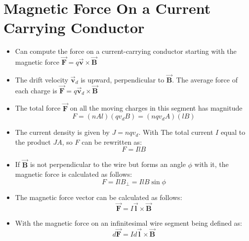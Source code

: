 \documentclass[11pt, a4paper]{article}
\begin{document}
\section[27.6, Magnetic Force On a Current Carrying Conductor]{Magnetic Force On a Current Carrying Conductor}
\begin{itemize}
    \item Can compute the force on a current-carrying conductor starting with the
        magnetic force $\vec{\mathbf{F}} = q \vec{\mathbf{v}} \times \vec{\mathbf{B}}$
    \item The drift velocity $\vec{\mathbf{v}}_d$ is upward, perpendicular to
        $\vec{\mathbf{B}}$. The average force of each charge is
        $\vec{\mathbf{F}}=q\vec{\mathbf{v}}_d \times \vec{\mathbf{B}}$ 
    \item The total force $\vec{\mathbf{F}}$ on all the moving charges in this segment
        has magnitude 
        \begin{equation}
            F = (nAl)(qv_{d}B) = (nqv_{d}A)(lB)
        \end{equation}
    \item The current density is given by $J = nqv_d$. With The total current $I$ equal
        to the product $JA$, so $F$ can be rewritten as:
        \begin{equation}
            F = IlB
        \end{equation}
    \item If $\vec{\mathbf{B}}$ is not perpendicular to the wire but forms an angle
        $\phi$ with it, the magnetic force is calculated as follows:
        \begin{equation}
            F = IlB_{\perp} = IlB\sin\phi
        \end{equation}
    \item The magnetic force vector can be calculated as follows:
        \begin{equation}
            \vec{\mathbf{F}} = I \vec{\mathbf{l}} \times \vec{\mathbf{B}}
        \end{equation}
    \item With the magnetic force on an infinitesimal wire segment being defined as:
        \begin{equation}
            d\vec{\mathbf{F}} = Id\vec{\mathbf{l}} \times \vec{\mathbf{B}}
        \end{equation}
\end{itemize}
\end{document}
